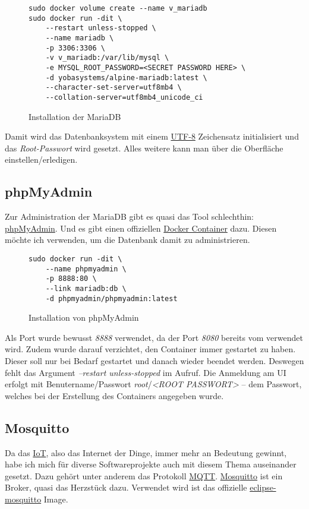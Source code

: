 \documentclass[12pt,a4paper]{article}
\newcommand{\code}[1]{\textit{#1}}
\begin{document}
\begin{figure}[H]
\begin{lstlisting}
sudo docker volume create --name v_mariadb
sudo docker run -dit \
    --restart unless-stopped \
    --name mariadb \
    -p 3306:3306 \
    -v v_mariadb:/var/lib/mysql \
    -e MYSQL_ROOT_PASSWORD=<SECRET PASSWORD HERE> \
    -d yobasystems/alpine-mariadb:latest \
    --character-set-server=utf8mb4 \
    --collation-server=utf8mb4_unicode_ci
\end{lstlisting}
\caption{Installation der MariaDB}\label{fig:Installation der MariaDB}
\end{figure}

Damit wird das Datenbanksystem mit einem \href{https://de.wikipedia.org/wiki/UTF-8}{UTF-8} Zeichensatz initialisiert und
das \code{Root-Passwort} wird gesetzt. Alles weitere kann man über die Oberfläche 
einstellen/erledigen.

\subsection{phpMyAdmin}\label{sub:phpMyAdmin}
Zur Administration der MariaDB gibt es quasi das Tool schlechthin: \href{https://www.phpmyadmin.net/}{phpMyAdmin}. Und
es gibt einen offiziellen \href{https://hub.docker.com/r/phpmyadmin/phpmyadmin}{Docker Container} dazu. Diesen möchte
ich verwenden, um die Datenbank damit zu administrieren.

\begin{figure}[H]
\begin{lstlisting}
sudo docker run -dit \
    --name phpmyadmin \
    -p 8888:80 \
    --link mariadb:db \
    -d phpmyadmin/phpmyadmin:latest
\end{lstlisting}
\caption{Installation von phpMyAdmin}\label{fig:Installation von phpMyAdmin}
\end{figure}

Als Port wurde bewusst \code{8888} verwendet, da der Port \code{8080} bereits vom  verwendet
wird. Zudem wurde darauf verzichtet, den Container immer gestartet zu haben. Dieser soll nur bei Bedarf gestartet und
danach wieder beendet werden. Deswegen fehlt das Argument \code{--restart unless-stopped} im Aufruf. Die Anmeldung am
UI erfolgt mit Benutername/Passwort \code{root}/\code{<ROOT PASSWORT>} -- dem Passwort, welches bei der Erstellung des
\nameref{sub:MariaDB} Containers angegeben wurde.

\subsection{Mosquitto}
Da das \href{https://de.wikipedia.org/wiki/Internet_der_Dinge#targetText=Das%20Internet%20der%20Dinge%20(IdD,und%20Kommunikationstechniken%20zusammenarbeiten%20zu%20lassen.}{IoT},
also das Internet der Dinge, immer mehr an Bedeutung gewinnt, habe ich mich für diverse Softwareprojekte auch mit diesem
Thema auseinander gesetzt. Dazu gehört unter anderem das Protokoll \href{http://mqtt.org/}{MQTT}.
\href{https://mosquitto.org/}{Mosquitto} ist ein Broker, quasi das Herzstück dazu. Verwendet wird ist das offizielle
\href{https://hub.docker.com/_/eclipse-mosquitto}{eclipse-mosquitto} Image.
\end{document}
